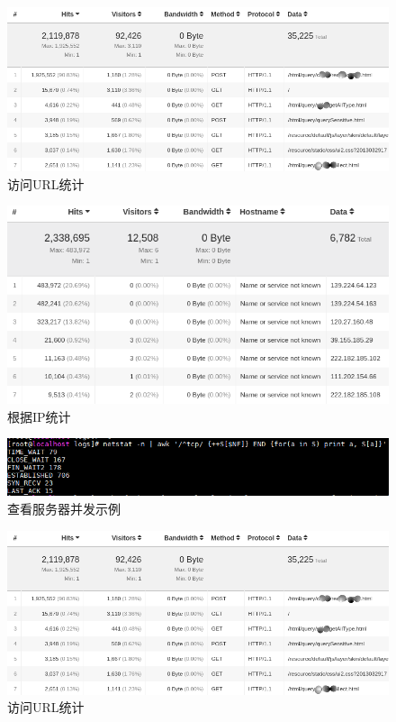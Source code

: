 \documentclass[8pt]{book}
\numberwithin{dummy}{section}
\theoremstyle{ocrenumbox}
\theoremstyle{blacknumex}
\theoremstyle{blacknumbox}
\theoremstyle{ocrenum}
\begin{document}
\begin{figure}[htbp]
	\centering
	\includegraphics[scale=0.35]{spideranalysis.png}
	\caption{访问URL统计}
	\label{fig:spideranalysis}
\end{figure}


\begin{figure}[htbp]
	\centering
	\includegraphics[scale=0.4]{ipstatistics.png}
	\caption{根据IP统计}
	\label{fig:ipstatistics}
\end{figure}


\begin{figure}[htbp]
	\centering
	\includegraphics[scale=0.5]{websiteconcurrentaccess.png}
	\caption{查看服务器并发示例}
	\label{fig:websiteconcurrentaccess}
\end{figure}

\begin{figure}[htbp]
	\centering
	\includegraphics[scale=0.35]{spideranalysis.png}
	\caption{访问URL统计}
	\label{fig:spideranalysis}
\end{figure}
\end{document}
